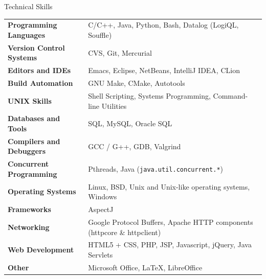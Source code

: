 \documentclass{resume}
\begin{document}
\begin{rSection}{Technical Skills}

{\renewcommand{\arraystretch}{1.3}
\begin{tabular}{ @{} >{\bfseries}l @{\hspace{6ex}} l }

Programming Languages
   & C/C++, Java, Python, Bash,  Datalog (LogiQL, Souffle) \\

Version Control Systems
   & CVS, Git, Mercurial \\

Editors and IDEs
   & Emacs, Eclipse, NetBeans, IntelliJ IDEA, CLion \\

Build Automation
   & GNU Make, CMake, Autotools \\

UNIX Skills
   & Shell Scripting, Systems Programming, Command-line Utilities \\

Databases and Tools
   & SQL, MySQL, Oracle SQL \\

Compilers and Debuggers
   & GCC / G++, GDB, Valgrind \\

Concurrent Programming
   & Pthreads, Java (\texttt{java.util.concurrent.*}) \\

Operating Systems
   & Linux, BSD, Unix and Unix-like operating systems, Windows \\

Frameworks
   & AspectJ \\

Networking
   & Google Protocol Buffers, Apache HTTP components (httpcore \& httpclient) \\

Web Development
   & HTML5 + CSS, PHP, JSP, Javascript, jQuery, Java Servlets \\

Other
   & Microsoft Office, \LaTeX{}, LibreOffice \\
\end{tabular}}
\end{rSection}


\end{document}
